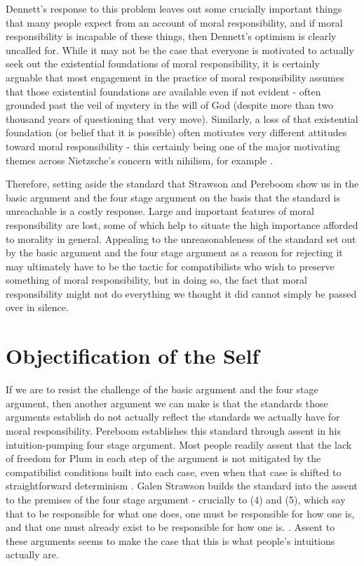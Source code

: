 \documentclass[phd,12pt,oneside,paper=letterpaper]{ubcthesis}
\begin{document}
Dennett's response to this problem leaves out some crucially important things that many people expect from an account of moral responsibility, and if moral responsibility is incapable of these things, then Dennett's optimism is clearly uncalled for. While it may not be the case that everyone is motivated to actually seek out the existential foundations of moral responsibility, it is certainly arguable that most engagement in the practice of moral responsibility assumes that those existential foundations are available even if not evident - often grounded past the veil of mystery in the will of God (despite more than two thousand years of questioning that very move). Similarly, a loss of that existential foundation (or belief that it is possible) often motivates very different attitudes toward moral responsibility - this certainly being one of the major motivating themes across Nietzsche's concern with nihilism, for example \citep{nietzsche2010}.

Therefore, setting aside the standard that Strawson and Pereboom show us in the basic argument and the four stage argument on the basis that the standard is unreachable is a costly response. Large and important features of moral responsibility are lost, some of which help to situate the high importance afforded to morality in general. Appealing to the unreasonableness of the standard set out by the basic argument and the four stage argument as a reason for rejecting it may ultimately have to be the tactic for compatibilists who wish to preserve something of moral responsibility, but in doing so, the fact that moral responsibility might not do everything we thought it did cannot simply be passed over in silence. 

\section{Objectification of the Self}
If we are to resist the challenge of the basic argument and the four stage argument, then another argument we can make is that the standards those arguments establish do not actually reflect the standards we actually have for moral responsibility. Pereboom establishes this standard through assent in his intuition-pumping four stage argument. Most people readily assent that the lack of freedom for Plum in each step of the argument is not mitigated by the compatibilist conditions built into each case, even when that case is shifted to straightforward determinism  \citep[p.116]{pereboom2001}. Galen Strawson builds the standard into the assent to the premises of the four stage argument - crucially to (4) and (5), which say that to be responsible for what one does, one must be responsible for how one is, and that one must already exist to be responsible for how one is. \citep[p.25]{strawsong2010}. Assent to these arguments seems to make the case that this is what people's intuitions actually are.
\end{document}
